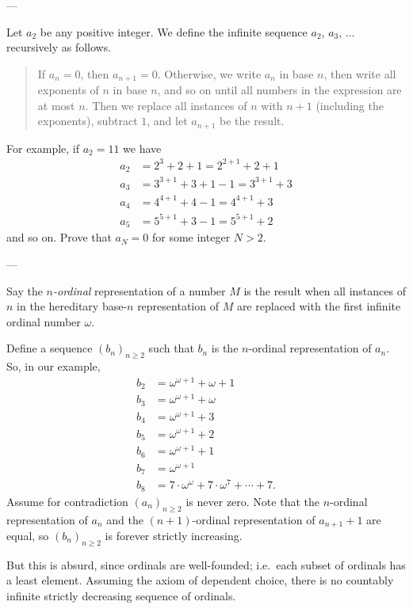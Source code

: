 
---

Let $a_2$ be any positive integer. We define the infinite sequence $a_2$, $a_3$, $\ldots$ recursively as follows.
\begin{quote}
    If $a_n=0$, then $a_{n+1}=0$. Otherwise, we write $a_n$ in base $n$, then write all exponents of $n$ in base $n$, and so on until all numbers in the expression are at most $n$. Then we replace all instances of $n$ with $n+1$ (including the exponents), subtract $1$, and let $a_{n+1}$ be the result.
\end{quote}
For example, if $a_2=11$ we have
\begin{align*}
    a_2&=2^3+2+1=2^{2+1}+2+1\\
    a_3&=3^{3+1}+3+1-1=3^{3+1}+3\\
    a_4&=4^{4+1}+4-1=4^{4+1}+3\\
    a_5&=5^{5+1}+3-1=5^{5+1}+2
\end{align*}
and so on. Prove that $a_N=0$ for some integer $N>2$.

---

Say the \emph{$n$-ordinal} representation of a number $M$ is the result when all instances of $n$ in the hereditary base-$n$ representation of $M$ are replaced with the first infinite ordinal number $\omega$.

Define a sequence $(b_n)_{n\ge2}$ such that $b_n$ is the $n$-ordinal representation of $a_n$. So, in our example,
\begin{align*}
    b_2&=\omega^{\omega+1}+\omega+1\\
    b_3&=\omega^{\omega+1}+\omega\\
    b_4&=\omega^{\omega+1}+3\\
    b_5&=\omega^{\omega+1}+2\\
    b_6&=\omega^{\omega+1}+1\\
    b_7&=\omega^{\omega+1}\\
    b_8&=7\cdot\omega^\omega+7\cdot\omega^7+\cdots+7.
\end{align*}
Assume for contradiction $(a_n)_{n\ge2}$ is never zero. Note that the $n$-ordinal representation of $a_n$ and the $(n+1)$-ordinal representation of $a_{n+1}+1$ are equal, so $(b_n)_{n\ge2}$ is forever strictly increasing.

But this is absurd, since ordinals are well-founded; i.e.\ each subset of ordinals has a least element. Assuming the axiom of dependent choice, there is no countably infinite strictly decreasing sequence of ordinals.

